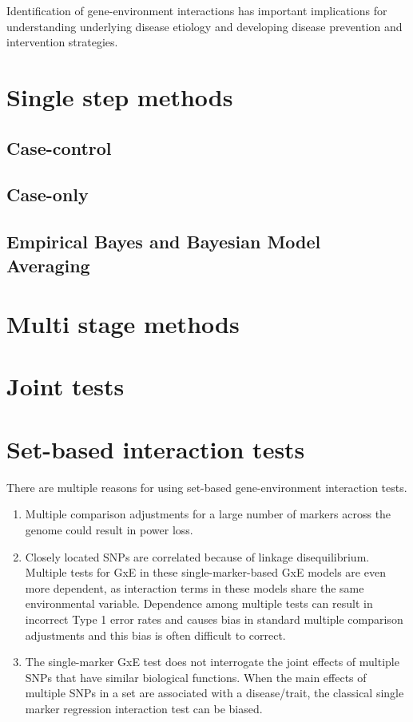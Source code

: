 \documentclass[]{book}
\providecommand{\tightlist}{%
  \setlength{\itemsep}{0pt}\setlength{\parskip}{0pt}}
\theoremstyle{definition}
\theoremstyle{definition}
\theoremstyle{definition}
\theoremstyle{remark}
\begin{document}
Identification of gene-environment interactions has important
implications for understanding underlying disease etiology and
developing disease prevention and intervention strategies.

\section{Single step methods}\label{single-step-methods}

\subsection{Case-control}\label{case-control}

\subsection{Case-only}\label{case-only}

\subsection{Empirical Bayes and Bayesian Model
Averaging}\label{empirical-bayes-and-bayesian-model-averaging}

\section{Multi stage methods}\label{multi-stage-methods}

\section{Joint tests}\label{joint-tests}

\section{Set-based interaction tests}\label{set-based-interaction-tests}

There are multiple reasons for using set-based gene-environment
interaction tests.

\begin{enumerate}
\def\labelenumi{\arabic{enumi}.}
\tightlist
\item
  Multiple comparison adjustments for a large number of markers across
  the genome could result in power loss.
\item
  Closely located SNPs are correlated because of linkage disequilibrium.
  Multiple tests for GxE in these single-marker-based GxE models are
  even more dependent, as interaction terms in these models share the
  same environmental variable. Dependence among multiple tests can
  result in incorrect Type 1 error rates and causes bias in standard
  multiple comparison adjustments and this bias is often difficult to
  correct.
\item
  The single-marker GxE test does not interrogate the joint effects of
  multiple SNPs that have similar biological functions. When the main
  effects of multiple SNPs in a set are associated with a disease/trait,
  the classical single marker regression interaction test can be biased.
\end{enumerate}
\end{document}
